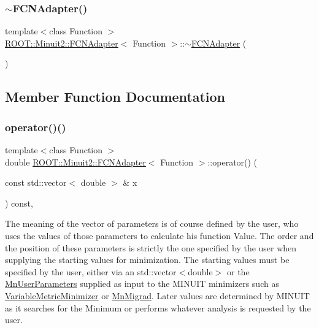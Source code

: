 \subsubsection{\texorpdfstring{$\sim$FCNAdapter()}{~FCNAdapter()}\hspace{0.1cm}{\footnotesize\ttfamily [2/2]}}
{\footnotesize\ttfamily template$<$class Function $>$ \\
\mbox{\hyperlink{classROOT_1_1Minuit2_1_1FCNAdapter}{R\+O\+O\+T\+::\+Minuit2\+::\+F\+C\+N\+Adapter}}$<$ Function $>$\+::$\sim$\mbox{\hyperlink{classROOT_1_1Minuit2_1_1FCNAdapter}{F\+C\+N\+Adapter}} (\begin{DoxyParamCaption}{ }\end{DoxyParamCaption})\hspace{0.3cm}{\ttfamily [inline]}}



\subsection{Member Function Documentation}
\mbox{\label{classROOT_1_1Minuit2_1_1FCNAdapter_a3d400764a6828594b68a00b905d450b2}} 
\subsubsection{\texorpdfstring{operator()()}{operator()()}\hspace{0.1cm}{\footnotesize\ttfamily [1/4]}}
{\footnotesize\ttfamily template$<$class Function $>$ \\
double \mbox{\hyperlink{classROOT_1_1Minuit2_1_1FCNAdapter}{R\+O\+O\+T\+::\+Minuit2\+::\+F\+C\+N\+Adapter}}$<$ Function $>$\+::operator() (\begin{DoxyParamCaption}\item[{const std\+::vector$<$ double $>$ \&}]{x }\end{DoxyParamCaption}) const\hspace{0.3cm}{\ttfamily [inline]}, {\ttfamily [virtual]}}

The meaning of the vector of parameters is of course defined by the user, who uses the values of those parameters to calculate his function Value. The order and the position of these parameters is strictly the one specified by the user when supplying the starting values for minimization. The starting values must be specified by the user, either via an std\+::vector$<$double$>$ or the \mbox{\hyperlink{classROOT_1_1Minuit2_1_1MnUserParameters}{Mn\+User\+Parameters}} supplied as input to the M\+I\+N\+U\+IT minimizers such as \mbox{\hyperlink{classROOT_1_1Minuit2_1_1VariableMetricMinimizer}{Variable\+Metric\+Minimizer}} or \mbox{\hyperlink{classROOT_1_1Minuit2_1_1MnMigrad}{Mn\+Migrad}}. Later values are determined by M\+I\+N\+U\+IT as it searches for the Minimum or performs whatever analysis is requested by the user.


